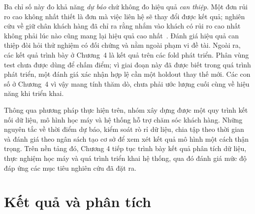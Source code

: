 \documentclass[12pt,a4paper]{report}
\begin{document}
Ba chỉ số này đo khả năng \emph{dự báo} chứ không đo hiệu quả \emph{can thiệp}. Một đơn rủi ro cao không nhất thiết là đơn mà việc liên hệ sẽ thay đổi được kết quả; nghiên cứu về giữ chân khách hàng đã chỉ ra rằng nhắm vào khách có rủi ro cao nhất không phải lúc nào cũng mang lại hiệu quả cao nhất~\cite{ascarza2018}. Đánh giá hiệu quả can thiệp đòi hỏi thử nghiệm có đối chứng và nằm ngoài phạm vi đề tài. Ngoài ra, các kết quả trình bày ở Chương~4 là kết quả trên các fold phát triển. Phân vùng test chưa được dùng để chấm điểm; vì giai đoạn này đã được biết trong quá trình phát triển, một đánh giá xác nhận hợp lệ cần một holdout thay thế mới. Các con số ở Chương~4 vì vậy mang tính thăm dò, chưa phải ước lượng cuối cùng về hiệu năng khi triển khai.

Thông qua phương pháp thực hiện trên, nhóm xây dựng được một quy trình kết nối dữ liệu, mô hình học máy và hệ thống hỗ trợ chăm sóc khách hàng. Những nguyên tắc về thời điểm dự báo, kiểm soát rò rỉ dữ liệu, chia tập theo thời gian và đánh giá theo ngân sách tạo cơ sở để xem xét kết quả mô hình một cách thận trọng. Trên nền tảng đó, Chương 4 tiếp tục trình bày kết quả phân tích dữ liệu, thực nghiệm học máy và quá trình triển khai hệ thống, qua đó đánh giá mức độ đáp ứng các mục tiêu nghiên cứu đã đặt ra.
 
\chapter{Kết quả và phân tích}\label{ch:results}

\end{document}
